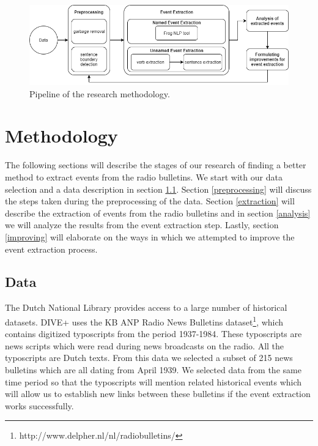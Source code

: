 \documentclass[a4paper, 10pt, conference]{ieeeconf}      %
\begin{document}

\begin{figure}[!h]
  \centering
  \includegraphics[width= \textwidth]{Temp_Pipeline}
  \caption{Pipeline of the research methodology.}
  \label{pipeline}
\end{figure}

\section{Methodology}
The following sections will describe the stages of our research of finding a better method to extract events from the radio bulletins. We start with our data selection and a data description in section \ref{data}. Section \ref{preprocessing} will discuss the steps taken during the preprocessing of the data. Section \ref{extraction} will describe the extraction of events from the radio bulletins and in section \ref{analysis} we will analyze the results from the event extraction step. Lastly, section \ref{improving} will elaborate on the ways in which we attempted to improve the event extraction process.


\subsection{Data}\label{data}
The Dutch National Library provides access to a large number of historical datasets. DIVE+ uses the KB ANP Radio News Bulletins dataset\footnote{http://www.delpher.nl/nl/radiobulletins/}, which contains digitized typoscripts from the period 1937-1984. These typoscripts are news scripts which were read during news broadcasts on the radio. All the typoscripts are Dutch texts. From this data we selected a subset of 215 news bulletins which are all dating from April 1939. We selected data from the same time period so that the typoscripts will mention related historical events which will allow us to establish new links between these bulletins if the event extraction works successfully.
\end{document}
